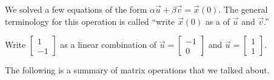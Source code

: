 \documentclass[../main.tex]{subfiles}
\begin{document}
\faStar{} We solved a few equations of the form \(\alpha \vec{u} + \beta \vec{v} = \vec{x}(0)\). The general terminology for this operation is called ``write \(\vec{x}(0)\) as a  of \(\vec{u}\) and \(\vec{v}\).''

\begin{example}
  Write \(\begin{bmatrix} 1 \\ -1 \end{bmatrix}\) as a linear combination of \(\vec{u} = \begin{bmatrix} -1 \\ 0 \end{bmatrix}\) and \(\vec{u} = \begin{bmatrix} 1 \\ 1 \end{bmatrix}\). 

\end{example}

\faStar{} The following is a summary of matrix operations that we talked about.
\end{document}
